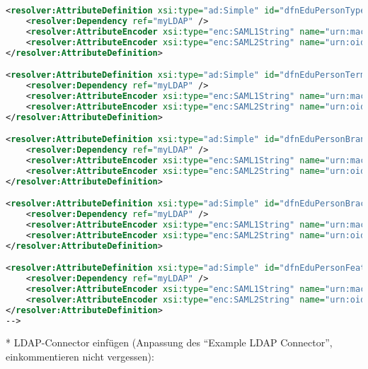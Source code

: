 \begin{lstlisting}[language=xml]
<resolver:AttributeDefinition xsi:type="ad:Simple" id="dfnEduPersonTypeOfStudy" sourceAttributeID="dfnEduPersonTypeOfStudy">
	<resolver:Dependency ref="myLDAP" />
	<resolver:AttributeEncoder xsi:type="enc:SAML1String" name="urn:mace:dir:attribute-def:dfnEduPersonTypeOfStudy" />
	<resolver:AttributeEncoder xsi:type="enc:SAML2String" name="urn:oid:1.3.6.1.4.1.22177.400.1.1.3.7" friendlyName="dfnEduPersonTypeOfStudy" />
</resolver:AttributeDefinition>

<resolver:AttributeDefinition xsi:type="ad:Simple" id="dfnEduPersonTermsOfStudy" sourceAttributeID="dfnEduPersonTermsOfStudy">
	<resolver:Dependency ref="myLDAP" />
	<resolver:AttributeEncoder xsi:type="enc:SAML1String" name="urn:mace:dir:attribute-def:dfnEduPersonTermsOfStudy" />
	<resolver:AttributeEncoder xsi:type="enc:SAML2String" name="urn:oid:1.3.6.1.4.1.22177.400.1.1.3.8" friendlyName="dfnEduPersonTermsOfStudy" />
</resolver:AttributeDefinition>

<resolver:AttributeDefinition xsi:type="ad:Simple" id="dfnEduPersonBranchAndDegree" sourceAttributeID="dfnEduPersonBranchAndDegree">
	<resolver:Dependency ref="myLDAP" />
	<resolver:AttributeEncoder xsi:type="enc:SAML1String" name="urn:mace:dir:attribute-def:dfnEduPersonBranchAndDegree" />
	<resolver:AttributeEncoder xsi:type="enc:SAML2String" name="urn:oid:1.3.6.1.4.1.22177.400.1.1.3.9" friendlyName="dfnEduPersonBranchAndDegree" />
</resolver:AttributeDefinition>

<resolver:AttributeDefinition xsi:type="ad:Simple" id="dfnEduPersonBrachAndType" sourceAttributeID="dfnEduPersonBrachAndType">
	<resolver:Dependency ref="myLDAP" />
	<resolver:AttributeEncoder xsi:type="enc:SAML1String" name="urn:mace:dir:attribute-def:dfnEduPersonBrachAndType" />
	<resolver:AttributeEncoder xsi:type="enc:SAML2String" name="urn:oid:1.3.6.1.4.1.22177.400.1.1.3.10" friendlyName="dfnEduPersonBrachAndType" />
</resolver:AttributeDefinition>

<resolver:AttributeDefinition xsi:type="ad:Simple" id="dfnEduPersonFeaturesOfStudy" sourceAttributeID="dfnEduPersonFeaturesOfStudy">
	<resolver:Dependency ref="myLDAP" />
	<resolver:AttributeEncoder xsi:type="enc:SAML1String" name="urn:mace:dir:attribute-def:dfnEduPersonFeaturesOfStudy" />
	<resolver:AttributeEncoder xsi:type="enc:SAML2String" name="urn:oid:1.3.6.1.4.1.22177.400.1.1.3.11" friendlyName="dfnEduPersonFeaturesOfStudy" />
</resolver:AttributeDefinition>
-->
\end{lstlisting}
* LDAP-Connector einfügen (Anpassung des "`Example LDAP Connector"', einkommentieren nicht vergessen):
